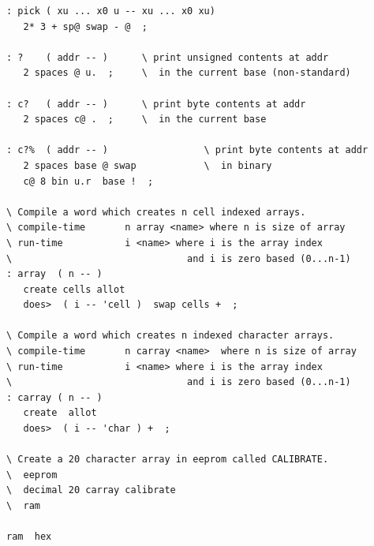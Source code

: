 \documentclass[12pt,a4paper]{article}
\begin{document}
{\begin{verbatim}
: pick ( xu ... x0 u -- xu ... x0 xu)
   2* 3 + sp@ swap - @  ;

: ?    ( addr -- )      \ print unsigned contents at addr
   2 spaces @ u.  ;     \  in the current base (non-standard)
   
: c?   ( addr -- )      \ print byte contents at addr
   2 spaces c@ .  ;     \  in the current base
   
: c?%  ( addr -- )                 \ print byte contents at addr
   2 spaces base @ swap            \  in binary
   c@ 8 bin u.r  base !  ;
   
\ Compile a word which creates n cell indexed arrays.
\ compile-time       n array <name> where n is size of array
\ run-time           i <name> where i is the array index
\                               and i is zero based (0...n-1)
: array  ( n -- )
   create cells allot
   does>  ( i -- 'cell )  swap cells +  ;   
   
\ Compile a word which creates n indexed character arrays.
\ compile-time       n carray <name>  where n is size of array
\ run-time           i <name> where i is the array index
\                               and i is zero based (0...n-1)
: carray ( n -- ) 
   create  allot 
   does>  ( i -- 'char ) +  ;

\ Create a 20 character array in eeprom called CALIBRATE.
\  eeprom
\  decimal 20 carray calibrate
\  ram    
   
ram  hex
\end{verbatim}
}


\newpage
\end{document}
